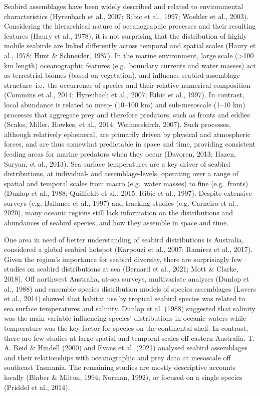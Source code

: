 \documentclass{article}
\begin{document}
\begin{linenumbers}
Seabird assemblages have been widely described and related to environmental characteristics (Hyrenbach et al., 2007; Ribic et al., 1997; Woehler et al., 2003). Considering the hierarchical nature of oceanographic processes and their resulting features (Haury et al., 1978), it is not surprising that the distribution of highly mobile seabirds are linked differently across temporal and spatial scales (Haury et al., 1978; Hunt \& Schneider, 1987). In the marine environment, large scale (\textgreater100 km length) oceanographic features (e.g.~boundary currents and water masses) act as terrestrial biomes (based on vegetation), and influence seabird assemblage structure--i.e.~the occurrence of species and their relative numerical composition (Commins et al., 2014; Hyrenbach et al., 2007; Ribic et al., 1997). In contrast, local abundance is related to meso- (10--100 km) and sub-mesoscale (1--10 km) processes that aggregate prey and therefore predators, such as fronts and eddies (Scales, Miller, Hawkes, et al., 2014; Weimerskirch, 2007). Such processes, although relatively ephemeral, are primarily driven by physical and atmospheric forces, and are thus somewhat predictable in space and time, providing consistent feeding areas for marine predators when they occur (Davoren, 2013; Hazen, Suryan, et al., 2013). Sea surface temperatures are a key driver of seabird distributions, at individual- and assemblage-levels, operating over a range of spatial and temporal scales from macro (e.g.~water masses) to fine (e.g.~fronts) (Dunlop et al., 1988; Quillfeldt et al., 2015; Ribic et al., 1997). Despite extensive surveys (e.g. Ballance et al., 1997) and tracking studies (e.g. Carneiro et al., 2020), many oceanic regions still lack information on the distributions and abundances of seabird species, and how they assemble in space and time.

One area in need of better understanding of seabird distributions is Australia, considered a global seabird hotspot (Karpouzi et al., 2007; Ramírez et al., 2017). Given the region's importance for seabird diversity, there are surprisingly few studies on seabird distributions at sea (Bernard et al., 2021; Mott \& Clarke, 2018). Off northwest Australia, at-sea surveys, multivariate analyses (Dunlop et al., 1988) and ensemble species distribution models of species assemblages (Lavers et al., 2014) showed that habitat use by tropical seabird species was related to sea surface temperatures and salinity. Dunlop et al. (1988) suggested that salinity was the main variable influencing species' distributions in oceanic waters while temperature was the key factor for species on the continental shelf. In contrast, there are few studies at large spatial and temporal scales off eastern Australia. T. A. Reid \& Hindell (2000) and Evans et al. (2021) analysed seabird assemblages and their relationships with oceanographic and prey data at mesoscale off southeast Tasmania. The remaining studies are mostly descriptive accounts locally (Blaber \& Milton, 1994; Norman, 1992), or focused on a single species (Priddel et al., 2014).


\end{linenumbers}
\end{document}
